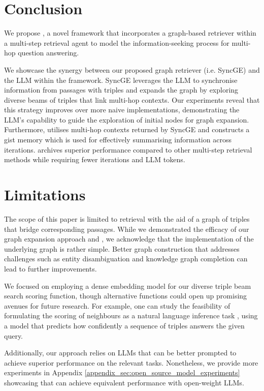 \section{Conclusion}
\label{sec: conclusion}
We propose \gear, a novel framework that incorporates a graph-based retriever within a multi-step retrieval agent to model the information-seeking process for multi-hop question answering. 

We showcase the synergy between our proposed graph retriever (i.e. SyncGE) and the LLM within the \gear framework. SyncGE leverages the LLM to synchronise information from passages with triples and expands the graph by exploring diverse beams of triples that link multi-hop contexts. Our experiments reveal that this strategy improves over more naive implementations, demonstrating the LLM's capability to guide the exploration of initial nodes for graph expansion. Furthermore, \gear utilises multi-hop contexts returned by SyncGE and constructs a gist memory which is used for effectively summarising information across iterations. \gear archives superior performance compared to other multi-step retrieval methods while requiring fewer iterations and LLM tokens.




\section*{Limitations}
\label{sec:limitations}


The scope of this paper is limited to retrieval with the aid of a graph of triples that bridge corresponding passages. While we demonstrated the efficacy of our graph expansion approach and \gear, we acknowledge that the implementation of the underlying graph is rather simple. Better graph construction that addresses challenges such as entity disambiguation \cite{Dredze2010} and knowledge graph completion \cite{Lin2015} can lead to further improvements. 

We focused on employing a dense embedding model for our diverse triple beam search scoring function, though alternative functions could open up promising avenues for future research. For example, one can study the feasibility of formulating the scoring of neighbours as a natural language inference task \cite{Wang2021}, using a model that predicts how confidently a sequence of triples answers the given query.

Additionally, our approach relies on LLMs that can be better prompted to achieve superior performance on the relevant \gear tasks. Nonetheless, we provide more experiments in Appendix \ref{appendix_sec:open_source_model_experiments} showcasing that \gear can achieve equivalent performance with open-weight LLMs.
